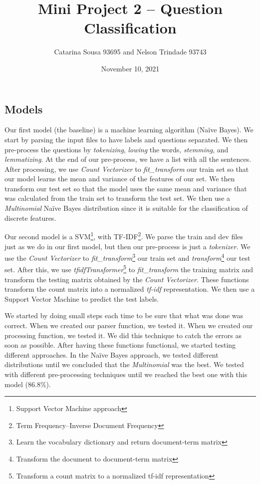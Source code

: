 \documentclass[11pt]{article}
\title{Mini Project 2 – Question Classification}
\author{Catarina Sousa 93695 and Nelson Trindade 93743}
\date{November 10, 2021}
\begin{document}
\maketitle

\begin{multicols}{2}

\section{Models}

Our first model (the baseline) is a machine learning algorithm (Naïve Bayes). We start by parsing the input files to have labels and questions separated. We then pre-process the questions by \emph{tokenizing}, \emph{lowing} the words, \emph{stemming}, and \emph{lemmatizing}. At the end of our pre-process, we have a list with all the sentences. After processing, we use \emph{Count Vectorizer} to \emph{fit\_transform} our train set so that our model learns the mean and variance of the features of our set. We then transform our test set so that the model uses the same mean and variance that was calculated from the train set to transform the test set. We then use a \emph{Multinomial} Naïve Bayes distribution since it is suitable for the classification of discrete features.

Our second model is a SVM\footnote[1]{Support Vector Machine approach}, with TF-IDF\footnote[2]{Term Frequency–Inverse Document Frequency}. We parse the train and dev files just as we do in our first model, but then our pre-process is just a \emph{tokenizer}. We use the \emph{Count Vectorizer} to \emph{fit\_transform}\footnote[3]{Learn the vocabulary dictionary and return document-term matrix} our train set and \emph{transform}\footnote[4]{Transform the document to document-term matrix} our test set. After this, we use \emph{tfidfTransformer}\footnote[5]{Transform a count matrix to a normalized tf-idf representation} to \emph{fit\_transform} the training matrix and transform the testing matrix obtained by the \emph{Count Vectorizer}. These functions transform the count matrix into a normalized \emph{tf-idf} representation. We then use a Support Vector Machine to predict the test labels.

We started by doing small steps each time to be sure that what was done was correct. When we created our parser function, we tested it. When we created our processing function, we tested it. We did this technique to catch the errors as soon as possible. After having these functions functional, we started testing different approaches. 
In the Naïve Bayes approach, we tested different distributions until we concluded that the \emph{Multinomial} was the best. We tested with different pre-processing techniques until we reached the best one with this model (86.8\%).


\end{multicols}
\end{document}
